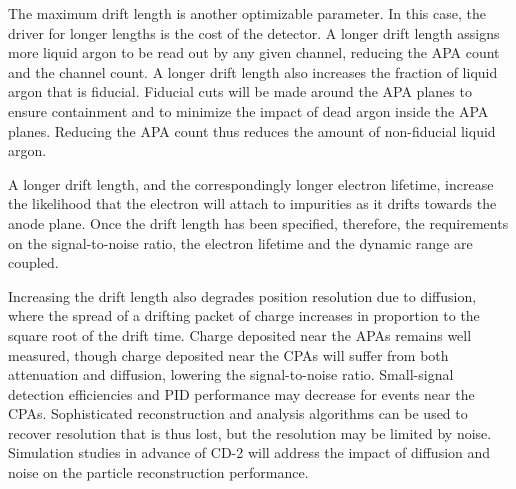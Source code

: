 The maximum drift length is another optimizable parameter.  In
this case, the driver for longer lengths is the cost of the detector.
A longer drift length assigns more liquid argon to be read out by any
given channel, reducing the APA count and the channel count.  A longer
drift length also increases the fraction of liquid argon that is
fiducial.  Fiducial cuts will be made around the APA planes
to ensure containment and to minimize the impact of dead argon inside the APA
planes.  Reducing the APA count thus reduces the amount of non-fiducial
liquid argon.  

A longer drift length, and the correspondingly longer electron lifetime, increase the
likelihood that the electron will attach to impurities as it drifts towards the
anode plane.  Once the drift length has been specified, therefore, the requirements on the 
signal-to-noise ratio, the electron lifetime and the dynamic range are coupled.

Increasing the drift length also degrades position resolution due to
diffusion, where the spread of a drifting packet of charge increases
in proportion to the square root of the drift time.  Charge deposited
near the APAs remains well measured, though charge deposited near the
CPAs will suffer from both attenuation and diffusion, lowering the
signal-to-noise ratio.  Small-signal detection efficiencies and PID
performance may decrease for events near the CPAs.  Sophisticated
reconstruction and analysis algorithms can be used to recover
resolution that is thus lost, but the resolution may be limited by
noise.  Simulation studies in advance of CD-2 will address the impact
of diffusion and noise on the particle reconstruction performance.
